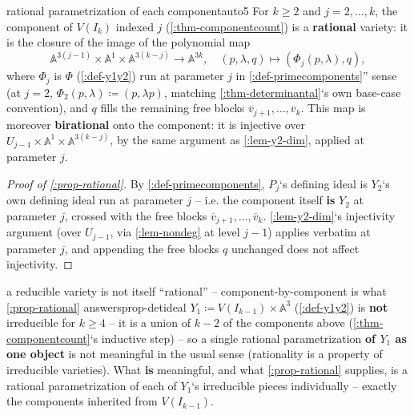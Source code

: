 \documentclass[a4paper,11pt]{scrartcl}
\begin{document}
\begin{proposition}{rational parametrization of each component}{auto5} For \(k \geq 2\) and \(j = 2,\ldots,k\), the component of \(V\left( I_{k} \right)\) indexed \(j\) (\cref{:thm-componentcount}) is a \textbf{rational} variety: it is the closure of the image of the polynomial map \[\mathbb{A}^{3(j - 1)} \times \mathbb{A}^{1} \times \mathbb{A}^{3(k - j)} \rightarrow \mathbb{A}^{3k},\quad(p,\lambda,q) \mapsto \left( \Phi_{j}(p,\lambda),q \right),\] where \(\Phi_{j}\) is \(\Phi\) (\cref{:def-y1y2}) run at parameter \(j\) in \cref{:def-primecomponents}'' sense (at \(j = 2\), \(\Phi_{2}(p,\lambda) ≔ (p,\lambda p)\), matching \cref{:thm-determinantal}`s own base-case convention), and \(q\) fills the remaining free blocks \({\overline{v}}_{j + 1},\ldots,{\overline{v}}_{k}\). This map is moreover \textbf{birational} onto the component: it is injective over \(U_{j - 1} \times \mathbb{A}^{1} \times \mathbb{A}^{3(k - j)}\), by the same argument as \cref{:lem-y2-dim}, applied at parameter \(j\).

\end{proposition} \protect{}\label{prop-rational}{}

\begin{proof}[Proof of \cref{:prop-rational}] By \cref{:def-primecomponents}, \(P_{j}\)`s defining ideal is \(Y_{2}\)`s own defining ideal run at parameter \(j\) -- i.e. the component itself \textbf{is} \(Y_{2}\) at parameter \(j\), crossed with the free blocks \({\overline{v}}_{j + 1},\ldots,{\overline{v}}_{k}\). \cref{:lem-y2-dim}`s injectivity argument (over \(U_{j - 1}\), via \cref{:lem-nondeg} at level \(j - 1\)) applies verbatim at parameter \(j\), and appending the free blocks \(q\) unchanged does not affect injectivity.

\end{proof}

\begin{remark}{a reducible variety is not itself ``rational'' -- component-by-component is what \cref{:prop-rational} answers}{prop-detideal} \(Y_{1} ≔ V\left( I_{k - 1} \right) \times \mathbb{A}^{3}\) (\cref{:def-y1y2}) is \textbf{not} irreducible for \(k \geq 4\) -- it is a union of \(k - 2\) of the components above (\cref{:thm-componentcount}`s inductive step) -- so a single rational parametrization \textbf{of \(Y_{1}\) as one object} is not meaningful in the usual sense (rationality is a property of irreducible varieties). What \textbf{is} meaningful, and what \cref{:prop-rational} supplies, is a rational parametrization of each of \(Y_{1}\)`s irreducible pieces individually -- exactly the components inherited from \(V\left( I_{k - 1} \right)\).

\end{remark}
\end{document}
